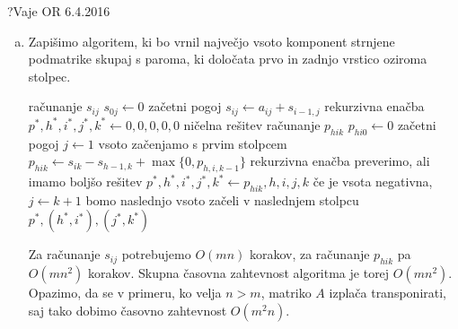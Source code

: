 \begin{naloga}{?}{Vaje OR 6.4.2016}
\begin{odgovor}
\begin{enumerate}[(a)]
\item Zapišimo algoritem,
ki bo vrnil največjo vsoto komponent strnjene podmatrike skupaj s paroma,
ki določata prvo in zadnjo vrstico oziroma stolpec.
\begin{small}
\begin{algorithmic}
     \hfill računanje $s_{ij}$
        \State $s_{0j} \gets 0$ \hfill začetni pogoj
            \State $s_{ij} \gets a_{ij} + s_{i-1,j}$ \hfill rekurzivna enačba
        \EndFor
    \EndFor
    \State $p^*, h^*, i^*, j^*, k^* \gets 0, 0, 0, 0, 0$
        \hfill ničelna rešitev
     \hfill računanje $p_{hik}$
            \State $p_{hi0} \gets 0$ \hfill začetni pogoj
            \State $j \gets 1$ \hfill vsoto začenjamo s prvim stolpcem
                \State $p_{hik} \gets s_{ik} - s_{h-1,k}
                                    + \max\{0, p_{h,i,k-1}\}$
                    \hfill rekurzivna enačba
                        \hfill preverimo, ali imamo boljšo rešitev
                    \State $p^*, h^*, i^*, j^*, k^* \gets p_{hik}, h, i, j, k$
                 \hfill če je vsota negativna,
                    \State $j \gets k+1$ \hfill
                        bomo naslednjo vsoto začeli v naslednjem stolpcu
                \EndIf
            \EndFor
        \EndFor
    \EndFor
    \State \Return $p^*, (h^*, i^*), (j^*, k^*)$
\EndFunction
\end{algorithmic}
\end{small}
Za računanje $s_{ij}$ potrebujemo $O(mn)$ korakov,
za računanje $p_{hik}$ pa $O(mn^2)$ korakov.
Skupna časovna zahtevnost algoritma je torej $O(mn^2)$.
Opazimo, da se v primeru, ko velja $n > m$,
matriko $A$ izplača transponirati,
saj tako dobimo časovno zahtevnost $O(m^2 n)$.
\end{enumerate}
\end{odgovor}
\end{naloga}
